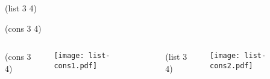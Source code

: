 \begin{frame}[fragile]
\LARGE
\begin{schemecode}
             (list 3 4)

             (cons 3 4)
\end{schemecode}
\end{frame}


\begin{frame}[fragile]
\begin{columns}[T]
\LARGE
{}
\begin{schemecode}
  (cons 3 4)
\end{schemecode}
\texttt{[image: list-cons1.pdf]}

\begin{schemecode}
  (list 3 4)
\end{schemecode}
\texttt{[image: list-cons2.pdf]}
\end{columns}
\end{frame}


\fi
